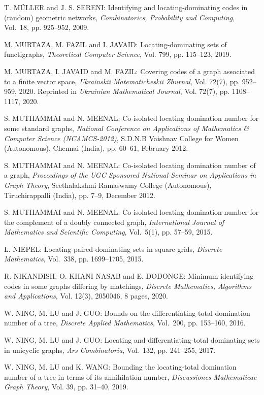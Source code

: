 \begin{thebibliography}{999}
T. M\"{U}LLER and J. S. SERENI: Identifying and locating-dominating codes in (random) geometric networks, {\it Combinatorics, Probability and Computing}, Vol.~18, pp. 925--952, 2009.

M. MURTAZA, M. FAZIL and I. JAVAID: Locating-dominating sets of functigraphs, {\it Theoretical Computer Science}, Vol. 799, pp. 115--123, 2019.

M. MURTAZA, I. JAVAID and M. FAZIL: Covering codes of a graph associated to a finite vector space, {\it Ukra\"{i}nskii Matematicheskii Zhurnal}, Vol. 72(7), pp. 952--959, 2020. Reprinted in {\it Ukrainian Mathematical Journal}, Vol. 72(7), pp. 1108--1117, 2020.

S. MUTHAMMAI and N. MEENAL: Co-isolated locating domination number for  some  standard  graphs, {\it National Conference on  Applications of Mathematics \& Computer Science (NCAMCS-2012)}, S.D.N.B  Vaishnav College for Women (Autonomous), Chennai (India), pp.  60--61, February 2012.

S. MUTHAMMAI and N. MEENAL: Co-isolated locating domination number of a  graph, {\it Proceedings of the UGC Sponsored National Seminar on  Applications  in  Graph Theory}, Seethalakshmi  Ramaswamy  College (Autonomous), Tiruchirappalli (India), pp. 7--9, December 2012.

S. MUTHAMMAI and N. MEENAL: Co-isolated locating domination number for the complement of a doubly connected graph, {\it International Journal of Mathematics and Scientific Computing}, Vol.~5(1), pp. 57--59, 2015.

L. NIEPEL: Locating-paired-dominating sets in square grids, {\it Discrete Mathematics}, Vol.~338, pp. 1699--1705, 2015.

R. NIKANDISH, O. KHANI NASAB and E. DODONGE: Minimum identifying codes in some graphs differing by matchings, {\it Discrete Mathematics, Algorithms and Applications}, Vol. 12(3), 2050046, 8 pages, 2020.

W. NING, M. LU and J. GUO: Bounds on the differentiating-total domination number of a tree, {\it Discrete Applied Mathematics}, Vol.~200, pp. 153--160, 2016.

W. NING, M. LU and J. GUO: Locating and differentiating-total dominating sets in unicyclic graphs, {\it Ars Combinatoria}, Vol.~132, pp. 241--255, 2017.

W. NING, M. LU and K. WANG: Bounding the locating-total domination number of a tree in terms of its annihilation number, {\it Discussiones Mathematicae Graph Theory}, Vol. 39, pp. 31--40, 2019.


\end{thebibliography}
